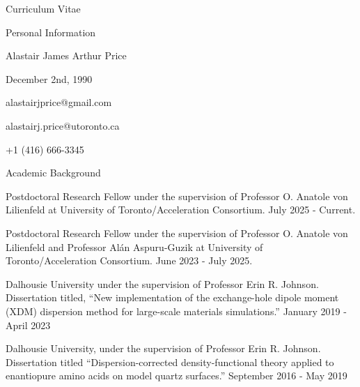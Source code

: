 \documentclass[a4paper,oneside,11pt]{article}
\date{}
\begin{document}
\begin{cv}{Curriculum Vitae}
  \begin{cvlist}{Personal Information}
    \item[Name] Alastair James Arthur Price
    \item[Born] December 2nd, 1990
    \item[Email] alastairjprice@gmail.com
    \item[Email] alastairj.price@utoronto.ca
    \item[Telephone] +1 (416) 666-3345
  \end{cvlist}

\setlength{\cvlabelwidth}{2.3cm}   \begin{cvlist}{Academic Background}
    \item[PDF]  Postdoctoral Research Fellow under the supervision of Professor O. Anatole von Lilienfeld at University of Toronto/Acceleration Consortium. July 2025 - Current.
    \item[PDF]  Postdoctoral Research Fellow under the supervision of Professor O. Anatole von Lilienfeld and Professor Alán Aspuru-Guzik at University of Toronto/Acceleration Consortium. June 2023 - July 2025.
    \item[Ph.D.] Dalhousie University
    under the supervision of Professor Erin R. Johnson.
    Dissertation titled, ``New implementation of the exchange-hole dipole moment (XDM) dispersion method for large-scale materials simulations.'' January 2019 -  April 2023
    \item[B.Sc Hons 1st] Dalhousie University, under the supervision of Professor Erin R. Johnson. Dissertation
    titled ``Dispersion-corrected density-functional theory applied to enantiopure amino acids on model quartz surfaces.'' %
    September 2016 - May 2019
  \end{cvlist}


\end{cv}
\end{document}
